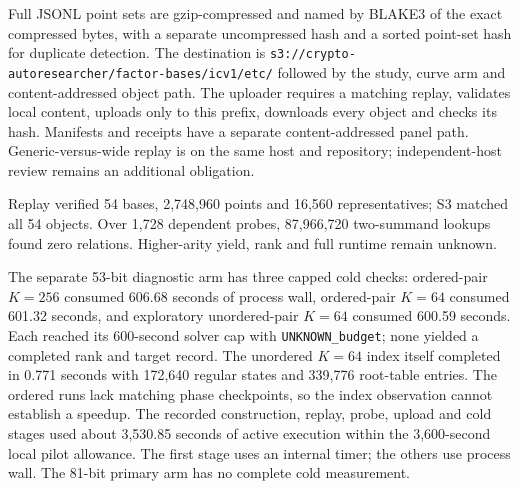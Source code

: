 \documentclass[11pt]{article}
\begin{document}
\begin{center}
\end{center}

Full JSONL point sets are gzip-compressed and named by BLAKE3 of the exact compressed bytes, with a separate uncompressed hash and a sorted point-set hash for duplicate detection. The destination is \nolinkurl{s3://crypto-autoresearcher/factor-bases/icv1/etc/} followed by the study, curve arm and content-addressed object path. The uploader requires a matching replay, validates local content, uploads only to this prefix, downloads every object and checks its hash. Manifests and receipts have a separate content-addressed panel path. Generic-versus-wide replay is on the same host and repository; independent-host review remains an additional obligation.

Replay verified 54 bases, 2,748,960 points and 16,560 representatives; S3 matched all 54 objects. Over 1,728 dependent probes, 87,966,720 two-summand lookups found zero relations. Higher-arity yield, rank and full runtime remain unknown.

The separate 53-bit diagnostic arm has three capped cold checks: ordered-pair $K=256$ consumed 606.68 seconds of process wall, ordered-pair $K=64$ consumed 601.32 seconds, and exploratory unordered-pair $K=64$ consumed 600.59 seconds. Each reached its 600-second solver cap with \texttt{UNKNOWN\_budget}; none yielded a completed rank and target record. The unordered $K=64$ index itself completed in 0.771 seconds with 172,640 regular states and 339,776 root-table entries. The ordered runs lack matching phase checkpoints, so the index observation cannot establish a speedup. The recorded construction, replay, probe, upload and cold stages used about 3,530.85 seconds of active execution within the 3,600-second local pilot allowance. The first stage uses an internal timer; the others use process wall. The 81-bit primary arm has no complete cold measurement.
\end{document}
